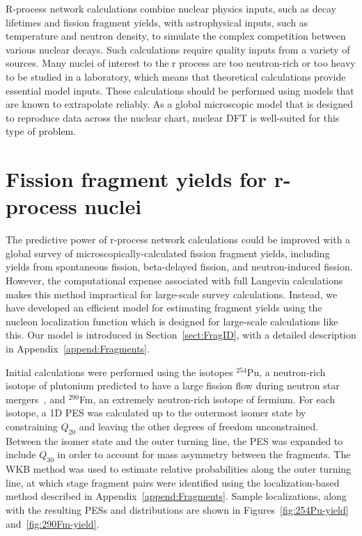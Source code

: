 R-process network calculations combine nuclear physics inputs, such as decay lifetimes and fission fragment yields, with astrophysical inputs, such as temperature and neutron density, to simulate the complex competition between various nuclear decays. Such calculations require quality inputs from a variety of sources. Many nuclei of interest to the r process are too neutron-rich or too heavy to be studied in a laboratory, which means that theoretical calculations provide essential model inputs. These calculations should be performed using models that are known to extrapolate reliably. As a global microscopic model that is designed to reproduce data across the nuclear chart, nuclear DFT is well-suited for this type of problem.

\section{Fission fragment yields for r-process nuclei}
The predictive power of r-process network calculations could be improved with a global survey of microscopically-calculated fission fragment yields, including yields from spontaneous fission, beta-delayed fission, and neutron-induced fission. However, the computational expense associated with full Langevin calculations makes this method impractical for large-scale survey calculations. Instead, we have developed an efficient model for estimating fragment yields using the nucleon localization function which is designed for large-scale calculations like this. Our model is introduced in Section~\ref{sect:FragID}, with a detailed description in Appendix~\ref{append:Fragments}.


Initial calculations were performed using the isotopes $^{254}$Pu, a neutron-rich isotope of plutonium predicted to have a large fission flow during neutron star mergers~\cite{Vassh2019}, and $^{290}$Fm, an extremely neutron-rich isotope of fermium. For each isotope, a 1D PES was calculated up to the outermost isomer state by constraining $Q_{20}$ and leaving the other degrees of freedom unconstrained. Between the isomer state and the outer turning line, the PES was expanded to include $Q_{30}$ in order to account for mass asymmetry between the fragments. The WKB method was used to estimate relative probabilities along the outer turning line, at which stage fragment pairs were identified using the localization-based method described in Appendix~\ref{append:Fragments}. Sample localizations, along with the resulting PESs and distributions are shown in Figures~\ref{fig:254Pu-yield} and~\ref{fig:290Fm-yield}.


